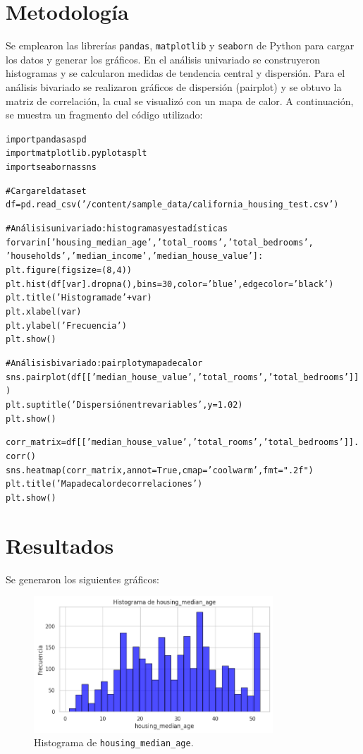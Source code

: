 \documentclass[a4paper, 10pt]{article}
\begin{document}
\section{Metodología}\label{s:3}
Se emplearon las librerías \texttt{pandas}, \texttt{matplotlib} y \texttt{seaborn} de Python para cargar los datos y generar los gráficos. En el análisis univariado se construyeron histogramas y se calcularon medidas de tendencia central y dispersión. Para el análisis bivariado se realizaron gráficos de dispersión (pairplot) y se obtuvo la matriz de correlación, la cual se visualizó con un mapa de calor. A continuación, se muestra un fragmento del código utilizado:

\begin{alltt}
import pandas as pd
import matplotlib.pyplot as plt
import seaborn as sns

# Cargar el dataset
df = pd.read_csv('/content/sample_data/california_housing_test.csv')

# Análisis univariado: histogramas y estadísticas
for var in ['housing_median_age', 'total_rooms', 'total_bedrooms',
            'households', 'median_income', 'median_house_value']:
    plt.figure(figsize=(8,4))
    plt.hist(df[var].dropna(), bins=30, color='blue', edgecolor='black')
    plt.title('Histograma de ' + var)
    plt.xlabel(var)
    plt.ylabel('Frecuencia')
    plt.show()

# Análisis bivariado: pairplot y mapa de calor
sns.pairplot(df[['median_house_value', 'total_rooms', 'total_bedrooms']])
plt.suptitle('Dispersión entre variables', y=1.02)
plt.show()

corr_matrix = df[['median_house_value', 'total_rooms', 'total_bedrooms']].corr()
sns.heatmap(corr_matrix, annot=True, cmap='coolwarm', fmt=".2f")
plt.title('Mapa de calor de correlaciones')
plt.show()
\end{alltt}

\section{Resultados}\label{s:4}
Se generaron los siguientes gráficos:

\begin{figure}[ht]
\centering
\includegraphics[width=0.8\textwidth]{graficas/housing_median_age.png}
\caption{Histograma de \texttt{housing\_median\_age}.}
\label{fig:hist_age}
\end{figure}
\end{document}
